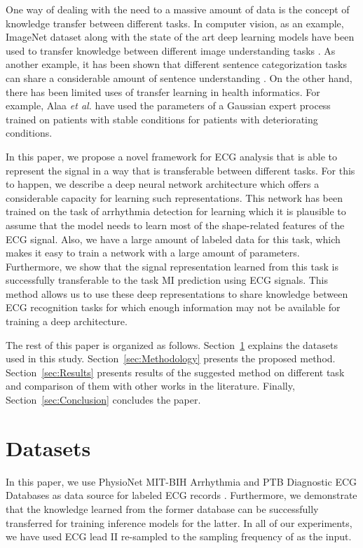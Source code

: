 \documentclass[10pt, conference, compsocconf]{IEEEtran}
\begin{document}
One way of dealing with the need to a massive amount of data is the concept of knowledge transfer between different tasks. In computer vision, as an example, ImageNet dataset along with the state of the art deep learning models have been used to transfer knowledge between different image understanding tasks \cite{Oquab2014LearningAT}. As another example, it has been shown that different sentence categorization tasks can share a considerable amount of sentence understanding \cite{Conneau}. On the other hand, there has been limited uses of transfer learning in health informatics. For example, Alaa \textit{et al.} \cite{alaa2018personalized} have used the parameters of a Gaussian expert process trained on patients with stable conditions for patients with deteriorating conditions.

In this paper, we propose a novel framework for ECG analysis that is able to represent the signal in a way that is transferable between different tasks. For this to happen, we describe a deep neural network architecture which offers a considerable capacity for learning such representations. This network has been trained on the task of arrhythmia detection for learning which it is plausible to assume that the model needs to learn most of the shape-related features of the ECG signal. Also, we have a large amount of labeled data for this task, which makes it easy to train a network with a large amount of parameters. Furthermore, we show that the signal representation learned from this task is successfully transferable to the task MI prediction using ECG signals. This method allows us to use these deep representations to share knowledge between ECG recognition tasks for which enough information may not be available for training a deep architecture.

The rest of this paper is organized as follows. Section~\ref{sec:Datasets} explains the datasets used in this study. Section~\ref{sec:Methodology} presents the proposed method. Section~\ref{sec:Results} presents results of the suggested method on different task and comparison of them with other works in the literature. Finally, Section~\ref{sec:Conclusion} concludes the paper.

\section{Datasets}
\label{sec:Datasets}
In this paper, we use PhysioNet MIT-BIH Arrhythmia and PTB Diagnostic ECG Databases as data source for labeled ECG records \cite{goldberger2000physiobank,moody2001impact,bousseljot1995nutzung}. Furthermore, we demonstrate that the knowledge learned from the former database can be successfully transferred for training inference models for the latter. In all of our experiments, we have used ECG lead II re-sampled to the sampling frequency of  as the input.
\end{document}
